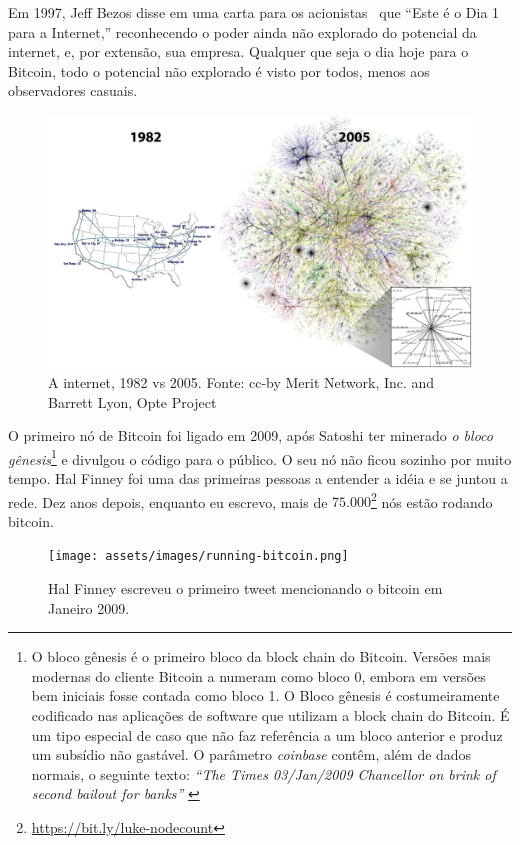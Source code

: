 Em 1997, Jeff Bezos disse em uma carta para os acionistas~\cite{bezos-letter} que
\enquote{Este é o Dia 1 para a Internet,} reconhecendo o poder ainda não explorado
do potencial da internet, e, por extensão, sua empresa. Qualquer que seja o dia hoje para o Bitcoin, 
todo o potencial não explorado é visto por todos, menos aos observadores casuais. 

\begin{figure}
  \includegraphics{assets/images/internet-evolution-white-dates.png}
  \caption{A internet, 1982 vs 2005. Fonte: cc-by Merit Network, Inc. and Barrett Lyon, Opte Project}
  \label{fig:internet-evolution-white-dates}
\end{figure}

O primeiro nó de Bitcoin foi ligado em 2009, após Satoshi ter minerado 
\textit{o bloco gênesis}\footnote{O bloco gênesis é o primeiro bloco da block chain do Bitcoin.
	Versões mais modernas do cliente Bitcoin a numeram como bloco $0$, embora em versões bem iniciais
	fosse contada como bloco 1. O Bloco gênesis é costumeiramente codificado nas aplicações de software 
	que utilizam a block chain do Bitcoin. É um tipo especial de caso que não faz referência a um bloco anterior 
	e produz um subsídio não gastável. O parâmetro \textit{coinbase} contêm, além de dados normais, o seguinte texto:
	\textit{\enquote{The Times 03/Jan/2009 Chancellor on brink of second bailout for banks}} \cite{btcwiki:genesis-block}}
e divulgou o código para o público. O seu nó não ficou sozinho por muito tempo. Hal Finney foi uma das primeiras pessoas
a entender a idéia e se juntou a rede. Dez anos depois, enquanto eu escrevo, mais de 
$75.000$\footnote{\url{https://bit.ly/luke-nodecount}} nós estão rodando bitcoin.

\begin{figure}
  \centering
  \texttt{[image: assets/images/running-bitcoin.png]}
  \caption{Hal Finney escreveu o primeiro tweet mencionando o bitcoin em Janeiro 2009.}
  \label{fig:running-bitcoin}
\end{figure}

